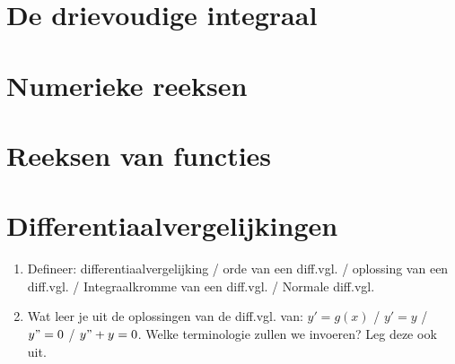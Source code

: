 \documentclass[a4paper,12pt]{article}
\begin{document}
    \section{De drievoudige integraal}

    \section{Numerieke reeksen}
    

    \section{Reeksen van functies}
    

    \section{Differentiaalvergelijkingen}
    \begin{enumerate}
        \item Defineer: differentiaalvergelijking / orde van een diff.vgl. / oplossing van een diff.vgl. / Integraalkromme van een diff.vgl. / Normale diff.vgl.
        \item Wat leer je uit de oplossingen van de diff.vgl. van: $y'=g(x)$ / $y'=y$ / $y"=0$ / $y"+y=0$. Welke terminologie zullen we invoeren? Leg deze ook uit.
    \end{enumerate}
    
\end{document}
